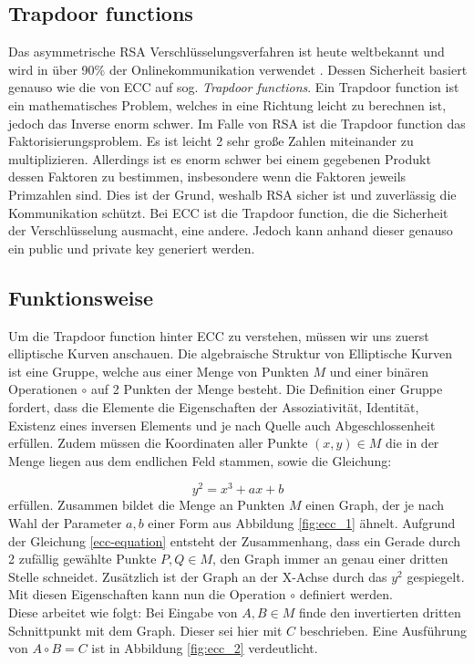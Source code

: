 \documentclass[11pt,a4paper]{scrreprt}
\begin{document}
\subsection{Trapdoor functions}
Das asymmetrische RSA Verschlüsselungsverfahren ist heute weltbekannt und wird in über 90\% der Onlinekommunikation verwendet \cite{ecc-rsa_amount}. Dessen Sicherheit basiert genauso wie die von ECC auf sog.  \textit{Trapdoor functions}. Ein Trapdoor function ist ein mathematisches Problem, welches in eine Richtung leicht zu berechnen ist, jedoch das Inverse enorm schwer. Im Falle von RSA ist die Trapdoor function das Faktorisierungsproblem. Es ist leicht 2 sehr große Zahlen miteinander zu multiplizieren. Allerdings ist es enorm schwer bei einem gegebenen Produkt dessen Faktoren zu bestimmen, insbesondere wenn die Faktoren jeweils Primzahlen sind. Dies ist der Grund, weshalb RSA sicher ist und zuverlässig die Kommunikation schützt. Bei ECC ist die Trapdoor function, die die Sicherheit der Verschlüsselung ausmacht, eine andere. Jedoch kann anhand dieser genauso ein public und private key generiert werden.
\subsection{Funktionsweise}
Um die Trapdoor function hinter ECC zu verstehen, müssen wir uns zuerst elliptische Kurven anschauen. Die algebraische Struktur von Elliptische Kurven ist eine Gruppe, welche aus einer Menge von Punkten $M$ und einer binären Operationen $\circ$ auf 2 Punkten der Menge besteht. Die Definition einer Gruppe fordert, dass die Elemente die Eigenschaften der Assoziativität, Identität, Existenz eines inversen Elements und je nach Quelle auch Abgeschlossenheit erfüllen. \cite{ecc-aradi2016einfuhrung}\cite{ecc-bogopolskij2008introduction} Zudem müssen die Koordinaten aller Punkte $(x,y) \in M$ die in der Menge liegen aus dem endlichen Feld stammen, sowie die Gleichung:

\begin{equation}
    \label{ecc-equation}
    y^2 = x^3+ax+b
\end{equation} erfüllen. Zusammen bildet die Menge an Punkten $M$ einen Graph, der je nach Wahl der Parameter $a,b$ einer Form aus Abbildung \ref{fig:ecc_1} ähnelt. Aufgrund der Gleichung \ref{ecc-equation} entsteht der Zusammenhang, dass ein Gerade durch 2 zufällig gewählte Punkte $P,Q \in M$, den Graph immer an genau einer dritten Stelle schneidet. Zusätzlich ist der Graph an der X-Achse durch das $y^2$ gespiegelt. Mit diesen Eigenschaften kann nun die Operation $\circ$ definiert werden.\\
Diese arbeitet wie folgt: Bei Eingabe von $A,B \in M$ finde den invertierten dritten Schnittpunkt mit dem Graph. Dieser sei hier mit $C$ beschrieben. Eine Ausführung von $A \circ B = C$ ist in Abbildung \ref{fig:ecc_2} verdeutlicht.
\end{document}
